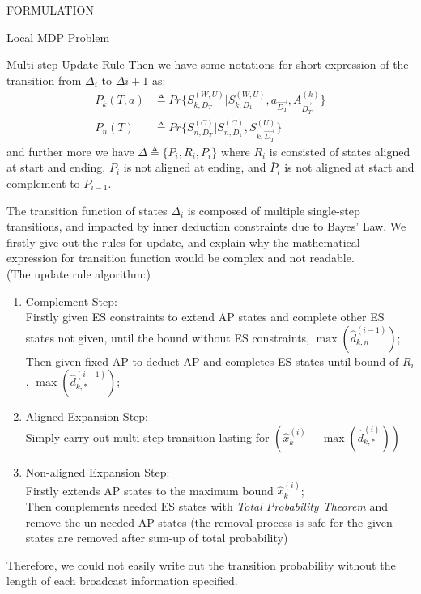 \documentclass[10pt, conference, letterpaper]{IEEEtran}
\begin{document}
\begin{section}{FORMULATION}
\begin{subsection}{Local MDP Problem}
\begin{subsubsection}{Multi-step Update Rule}
                Then we have some notations for short expression of the transition from $\Delta_{i}$ to $\Delta{i+1}$ as:
                \begin{align}
                    P_k(T,a) &\triangleq Pr\{ S^{(W,U)}_{k,D_T}|S^{(W,U)}_{k,D_1}, a_{\vec{D_T}},A^{(k)}_{\vec{D_T} }\}
                    \\
                    P_n(T) &\triangleq Pr\{ S^{(C)}_{n,D_T}|S^{(C)}_{n,D_1}, S^{(U)}_{k,\vec{D_T}} \}
                \end{align}
                and further more we have $\Delta \triangleq \{ \bar{P}_i, R_i, P_i \}$ where $R_i$ is consisted of states aligned at start and ending, $P_i$ is not aligned at ending, and $\bar{P}_i$ is not aligned at start and complement to $P_{i-1}$.

                The transition function of states $\Delta_i$ is composed of multiple single-step transitions, and impacted by inner deduction constraints due to Bayes' Law. We firstly give out the rules for update, and explain why the mathematical expression for transition function would be complex and not readable.
                \\
                (The update rule algorithm:)
                \begin{enumerate}
                    \item Complement Step: \\
                    Firstly given ES constraints to extend AP states and complete other ES states not given, until the bound without ES constraints, $\max(\hat{d}_{k,n}^{(i-1)})$;\\
                    Then given fixed AP to deduct AP and completes ES states until bound of $R_i$, $\max(\hat{d}^{(i-1)}_{k,*})$;
                    \item Aligned Expansion Step: \\
                    Simply carry out multi-step transition lasting for $( \hat{x}^{(i)}_k - \max(\hat{d}^{(i)}_{k,*}) )$
                    \item Non-aligned Expansion Step: \\
                    Firstly extends AP states to the maximum bound $\hat{x}^{(i)}_k$; \\
                    Then complements needed ES states with \emph{Total Probability Theorem} and remove the un-needed AP states (the removal process is safe for the given states are removed after sum-up of total probability)
                \end{enumerate}
                Therefore, we could not easily write out the transition probability without the length of each broadcast information specified.
            \end{subsubsection}


\end{subsection}
\end{section}
\end{document}
